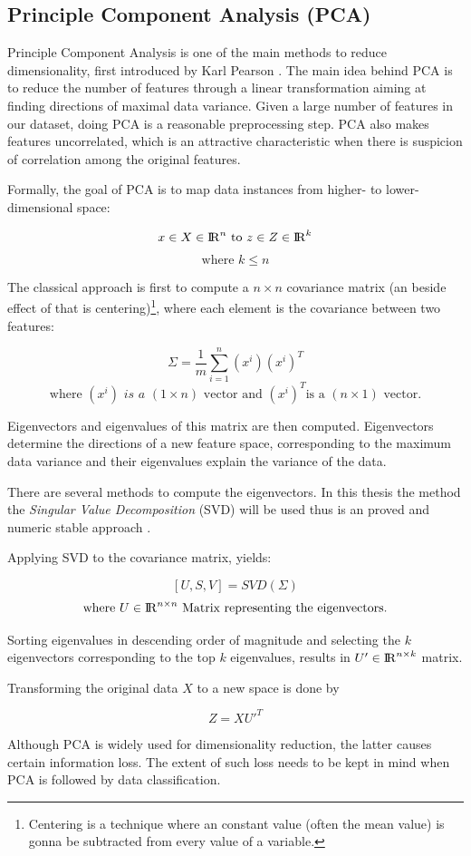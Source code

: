 \subsection{Principle Component Analysis (PCA)}\label{Ch:2:PCA} 
Principle Component Analysis is one of the main methods to reduce dimensionality, first introduced by Karl Pearson \cite{Pearson:1901}. The main idea behind PCA is to reduce the number of features through a linear transformation aiming at finding directions of maximal data variance. Given a large number of features in our dataset, doing PCA is a reasonable preprocessing step. PCA also makes features uncorrelated, which is an attractive characteristic when there is suspicion of correlation among the original features.

Formally, the goal of PCA is to map data instances from higher- to lower-dimensional space:

\[ x \in X \in {\rm I\!R}^n \textrm{ to } z \in Z \in {\rm I\!R}^k \]
\[ \textrm{where } k \leq n \]

The classical approach is first to compute a \(n \times n \) covariance matrix (an beside effect of that is centering)\footnote{Centering is a technique where an constant value (often the mean value) is gonna be subtracted from every value of a variable.}, where each element is the covariance between two features:

\[ \Sigma = \frac{1}{m}\sum_{i = 1}^{n}(x^i)(x^i)^T\]
\[ \textrm{where }(x^i) \textit{ is a } (1 \times n) \textrm{ vector and } (x^i)^T \textrm{is a } (n \times 1) \textrm{ vector.}\]

Eigenvectors and eigenvalues of this matrix are then computed. Eigenvectors determine the directions of a new feature space, corresponding to the maximum data variance and their eigenvalues explain the variance of the data.

There are several methods to compute the eigenvectors.
In this thesis the method the \textit{Singular Value Decomposition} (SVD) will be used thus is an proved and numeric stable approach \cite{wall2003svd,zouht04}.  

Applying SVD to the covariance matrix, yields:

\[ [U,S,V] = SVD(\Sigma)\]
\[ \textrm{where  } U \in  {\rm I\!R}^{n \times n} \textrm{ Matrix representing the eigenvectors.}  \]

Sorting eigenvalues in descending order of magnitude and selecting the \( k \) eigenvectors corresponding to the top \( k \) eigenvalues, results in \( U' \in   {\rm I\!R}^{n \times k}\) matrix.

Transforming the original data \( X \) to a new space is done by

\[ Z = X U'^ T \]

Although PCA is widely used for dimensionality reduction, the latter causes certain information loss. The extent of such loss needs to be kept in mind when PCA is followed by data classification. 